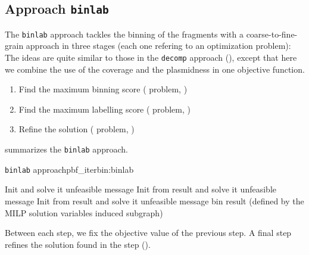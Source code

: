\subsection{Approach \texttt{binlab}}\label{sec:pbf_iterbin:binlab}

The \texttt{binlab} approach tackles the binning of the fragments with a coarse-to-fine-grain approach in three stages (each one refering to an optimization problem):
The ideas are quite similar to those in the \texttt{decomp} approach (), except that here we combine the use of the coverage and the plasmidness in one objective function.

\begin{enumerate}[label=\roman*.]
  \item Find the maximum binning score (\MBS{} problem, )
  \item Find the maximum labelling score (\MLS{} problem, )
  \item Refine the solution (\MRBS{} problem, )
\end{enumerate}

 summarizes the \texttt{binlab} approach.

\begin{tcbalgo}{\texttt{binlab} approach}{pbf_iterbin:binlab}
  \begin{algorithmic}[1]
    \State{} Init \MBS{} and solve it
    \State{} \Return{}unfeasible message
    \EndIf{}
    \State{} Init \MLS{} from \MBS{} result and solve it
    \State{} \Return{}unfeasible message
    \EndIf{}
    \State{} Init \MRBS{} from \MLS{} result and solve it
    \State{} \Return{}unfeasible message
    \EndIf{}
    \State{} \Return{}\MRBS{} bin result (defined by the MILP solution variables induced subgraph)
    \EndFunction{}
  \end{algorithmic}
\end{tcbalgo}

Between each step, we fix the objective value of the previous step.
A final step refines the solution found in the \MLS{} step ().



